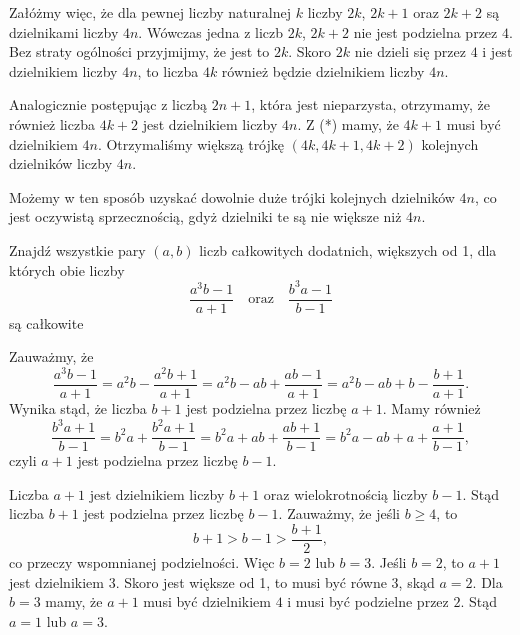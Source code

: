 \vspace{10px}

\noindent
Załóżmy więc, że dla pewnej liczby naturalnej $k$ liczby $2k$, $2k + 1$ oraz $2k + 2$ są dzielnikami liczby $4n$. Wówczas jedna z liczb $2k$, $2k + 2$ nie jest podzielna przez $4$. Bez straty ogólności przyjmijmy, że jest to $2k$. Skoro $2k$ nie dzieli się przez $4$ i jest dzielnikiem liczby $4n$, to liczba $4k$ również będzie dzielnikiem liczby $4n$. 

Analogicznie postępując z liczbą $2n + 1$, która jest nieparzysta, otrzymamy, że również liczba $4k + 2$ jest dzielnikiem liczby $4n$. Z (*) mamy, że $4k + 1$ musi być dzielnikiem $4n$. Otrzymaliśmy większą trójkę $(4k, 4k + 1, 4k + 2)$ kolejnych dzielników liczby $4n$.

\vspace{10px}

\noindent
Możemy w ten sposób uzyskać dowolnie duże trójki kolejnych dzielników $4n$, co jest oczywistą sprzecznością, gdyż dzielniki te są nie większe niż $4n$.

\vspace{10px}

\begin{problem}{4}
	Znajdź wszystkie pary $(a, b)$ liczb całkowitych dodatnich, większych od 1, dla których obie liczby
	\[
		\frac{a^3b - 1}{a + 1} \quad \text{oraz} \quad \frac{b^3a - 1}{b - 1}
	\]
	są całkowite
\end{problem}


\noindent
Zauważmy, że 
\[
	\frac{a^3b - 1}{a + 1} = a^2b - \frac{a^2b + 1}{a + 1} = a^2b - ab + \frac{ab - 1}{a + 1} = a^2b - ab + b - \frac{b + 1}{a + 1}.
\]
Wynika stąd, że liczba $b + 1$ jest podzielna przez liczbę $a + 1$. Mamy również
\[
	\frac{b^3a + 1}{b - 1} = b^2a + \frac{b^2a + 1}{b - 1} = b^2a + ab + \frac{ab + 1}{b - 1} = b^2a - ab + a + \frac{a + 1}{b - 1},
\]
czyli $a + 1$ jest podzielna przez liczbę $b - 1$. 

\vspace{10px}

\noindent
Liczba $a + 1$ jest dzielnikiem liczby $b + 1$ oraz wielokrotnością liczby $b - 1$. Stąd liczba $b + 1$ jest podzielna przez liczbę $b - 1$. Zauważmy, że jeśli $b \geqslant 4$, to
\[
	b + 1 > b - 1 > \frac{b + 1}{2},
\]
co przeczy wspomnianej podzielności.
Więc $b = 2$ lub $b = 3$. Jeśli $b = 2$, to $a + 1$ jest dzielnikiem $3$. Skoro jest większe od 1, to musi być równe 3, skąd $a = 2$. Dla $b = 3$ mamy, że $a + 1$ musi być dzielnikiem $4$ i musi być podzielne przez $2$. Stąd $a = 1$ lub $a = 3$. 

